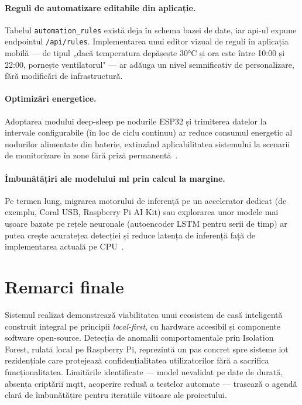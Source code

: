 \paragraph{Reguli de automatizare editabile din aplicație.}  Tabelul
\texttt{automation\_rules} există deja în schema bazei de date, iar \gls{api}-ul
expune endpointul \texttt{/api/rules}.  Implementarea unui editor vizual de
reguli în aplicația mobilă — de tipul „dacă temperatura depășește 30°C și
ora este între 10:00 și 22:00, pornește ventilatorul" — ar adăuga un nivel
semnificativ de personalizare, fără modificări de infrastructură.

\paragraph{Optimizări energetice.}  Adoptarea modului deep-sleep pe nodurile
ESP32 și trimiterea datelor la intervale configurabile (în loc de ciclu
continuu) ar reduce consumul energetic al nodurilor alimentate din baterie,
extinzând aplicabilitatea sistemului la scenarii de monitorizare în zone fără
priză permanentă~\cite{shi2016edge,premsankar2018edgeiot}.

\paragraph{Îmbunătățiri ale modelului \gls{ml} prin calcul la margine.}
Pe termen lung, migrarea motorului de inferență pe un accelerator dedicat
(de exemplu, Coral USB, Raspberry Pi AI Kit) sau explorarea unor modele mai
ușoare bazate pe rețele neuronale (autoencoder LSTM pentru serii de timp)
ar putea crește acuratețea detecției și reduce latența de inferență față de
implementarea actuală pe CPU~\cite{chalapathy2019deepanomaly,shi2016edge}.

\section{Remarci finale}

Sistemul realizat demonstrează viabilitatea unui ecosistem de casă
inteligentă construit integral pe principii \emph{local-first}, cu hardware
accesibil și componente software open-source.  Detecția de anomalii
comportamentale prin Isolation Forest, rulată local pe Raspberry Pi,
reprezintă un pas concret spre sisteme \gls{iot} rezidențiale care protejează
confidențialitatea utilizatorilor fără a sacrifica funcționalitatea.
Limitările identificate — model nevalidat pe date de durată, absența
criptării \gls{mqtt}, acoperire redusă a testelor automate — trasează o
agendă clară de îmbunătățire pentru iterațiile viitoare ale proiectului.
